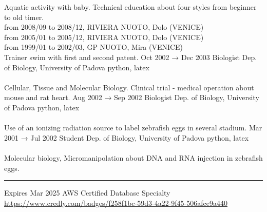 \documentclass[9pt]{stackoverflow} %
\begin{document}
\begin{tcolorbox}
{\begin{entrylist}
{		Aquatic activity with baby. Technical education about four styles from beginner to old timer.\\
		from 2008/09 to 2008/12, RIVIERA NUOTO, Dolo (VENICE)\\
		from 2005/01 to 2005/12, RIVIERA NUOTO, Dolo (VENICE)\\
		from 1999/01 to 2002/03, GP NUOTO, Mira (VENICE)\\
		Trainer swim with first and second patent.}
	\entry
		{Oct 2002 → Dec 2003}
		{Biologist}
		{Dep. of Biology, University of Padova}
		{{python, latex}\\\\
		Cellular, Tissue and Molecular Biology. Clinical trial - medical operation about mouse and rat heart.}
	\entry
		{Aug 2002 → Sep 2002}
		{Biologist}
		{Dep. of Biology, University of Padova}
		{{python, latex}\\\\
		Use of an ionizing radiation source to label zebrafish eggs in several stadium.}
	\entry
		{Mar 2001 → Jul 2002}
		{Student}
		{Dep. of Biology, University of Padova}
		{{python, latex}\\\\
		Molecular biology, Micromanipolation about DNA and RNA injection in zebrafish eggs.}
\end{entrylist}}
\end{tcolorbox}


\textcolor{stackoverflow}{\hrule}
\vspace{4pt} %
\begin{tcolorbox}[blanker,width=0.75\textwidth,enlarge left by=0.25\textwidth,before skip=6pt,breakable,
	overlay unbroken and first={%
	  \node[inner sep=0pt,outer sep=0pt,text width=0.35\textwidth,
		align=none,
		below right]
		at ([xshift=-0.25\textwidth]frame.north west)
{
	\vspace{\baselineskip} %
	\cvsect{Certifications}
};}]
{\vspace{-16.3pt} %
	\small\begin{entrylist}
	\entry
		{Expires Mar 2025}
		{AWS Certified Database}
		{Specialty}
		{\href{https://www.credly.com/badges/f258f1bc-59d3-4a22-9f45-506afce9a440}{https://www.credly.com/badges/f258f1bc-59d3-4a22-9f45-506afce9a440}}
	\end{entrylist}}
\end{tcolorbox}
\end{document}

